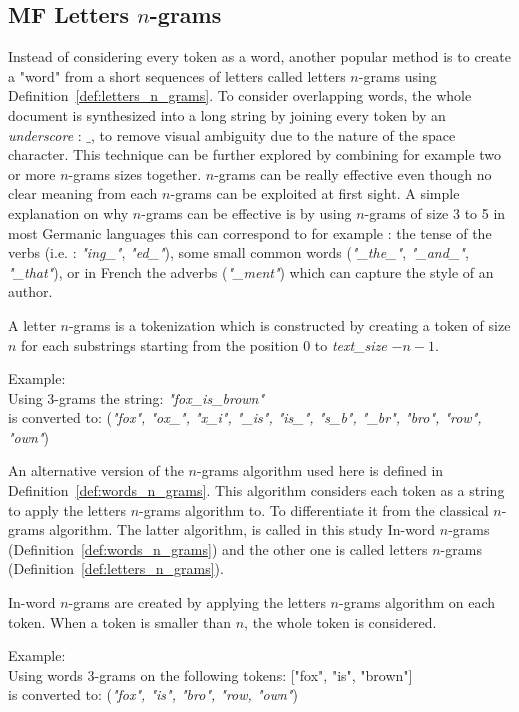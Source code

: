 \subsection{MF Letters $n$-grams}

Instead of considering every token as a word, another popular method is to create a "word" from a short sequences of letters called letters $n$-grams using Definition~\ref{def:letters_n_grams}.
To consider overlapping words, the whole document is synthesized into a long string by joining every token by an \textit{underscore} : $\_$, to remove visual ambiguity due to the nature of the space character.
This technique can be further explored by combining for example two or more $n$-grams sizes together.
$n$-grams can be really effective even though no clear meaning from each $n$-grams can be exploited at first sight.
A simple explanation on why $n$-grams can be effective is by using $n$-grams of size 3 to 5 in most Germanic languages this can correspond to for example : the tense of the verbs (i.e. : \textit{"ing\_"}, \textit{"ed\_"}), some small common words (\textit{"\_the\_"}, \textit{"\_and\_"}, \textit{"\_that"}), or in French the adverbs (\textit{"\_ment"}) which can capture the style of an author.

\begin{definition}
  \label{def:letters_n_grams}
  A letter $n$-grams is a tokenization which is constructed by creating a token of size $n$ for each substrings starting from the position $0$ to \textit{text\_size} $- n - 1$.

  Example: \\
  Using 3-grams the string: \textit{"fox\_is\_brown"} \\
  is converted to: (\textit{"fox", "ox\_", "x\_i", "\_is", "is\_", "s\_b", "\_br", "bro", "row", "own"})
\end{definition}

An alternative version of the $n$-grams algorithm used here is defined in Definition~\ref{def:words_n_grams}.
This algorithm considers each token as a string to apply the letters $n$-grams algorithm to.
To differentiate it from the classical $n$-grams algorithm.
The latter algorithm, is called in this study In-word $n$-grams (Definition~\ref{def:words_n_grams}) and the other one is called letters $n$-grams (Definition~\ref{def:letters_n_grams}).

\begin{definition}
  \label{def:words_n_grams}
  In-word $n$-grams are created by applying the letters $n$-grams algorithm on each token.
  When a token is smaller than $n$, the whole token is considered.

  Example: \\
  Using words 3-grams on the following tokens: ["fox", "is", "brown"] \\
  is converted to: (\textit{"fox", "is", "bro", "row, "own"})
\end{definition}

